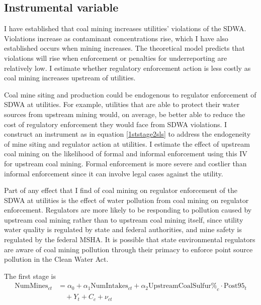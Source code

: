 \documentclass[12pt]{article}
\begin{document}
\subsection{Instrumental variable}

I have established that coal mining increases utilities' violations of the SDWA. Violations increase as contaminant concentrations rise, which I have also established occurs when mining increases. The theoretical model predicts that violations will rise when enforcement or penalties for underreporting are relatively low. I estimate whether regulatory enforcement action is less costly as coal mining increases upstream of utilities. 

Coal mine siting and production could be endogenous to regulator enforcement of SDWA at utilities. For example, utilities that are able to protect their water sources from upstream mining would, on average, be better able to reduce the cost of regulatory enforcement they would face from SDWA violations. I construct an instrument as in equation \ref{1ststage2sls} to address the endogeneity of mine siting and regulator action at utilities. I estimate the effect of upstream coal mining on the likelihood of formal and informal enforcement using this IV for upstream coal mining. Formal enforcement is more severe and costlier than informal enforcement since it can involve legal cases against the utility.

Part of any effect that I find of coal mining on regulator enforcement of the SDWA at utilities is the effect of water pollution from coal mining on regulator enforcement. Regulators are more likely to be responding to pollution caused by upstream coal mining rather than to upstream coal mining itself, since utility water quality is regulated by state and federal authorities, and mine safety is regulated by the federal MSHA. It is possible that state environmental regulators are aware of coal mining pollution through their primacy to enforce point source pollution in the Clean Water Act.

The first stage is
\begin{equation}\label{1ststage2slsreg}
\begin{split}
\text{NumMines}_{ct} &= \alpha_0 + \alpha_1\text{NumIntakes}_{ct} + \alpha_2\text{UpstreamCoalSulfur\%}_c \cdot \text{Post95}_t \\
&\quad + Y_t + C_c + \nu_{ct}
\end{split}
\end{equation}
\end{document}
